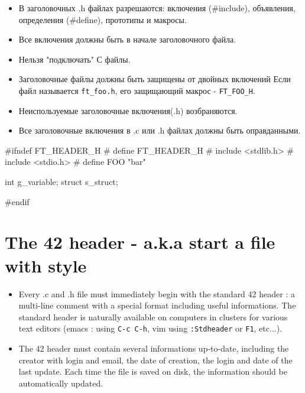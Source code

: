 \documentclass{42-ru}
\begin{document}
        \begin{itemize}

            \item В заголовочных .h файлах разрешаются: включения (#include),
                объявления, определения (#define), прототипы и макросы.

            \item Все включения должны быть в начале заголовочного файла.

            \item Нельзя "подключать" С файлы.

            \item Заголовочные файлы должны быть защищены от двойных включений
                Если файл называется \texttt{ft\_foo.h}, его защищающий макрос - \texttt{FT\_FOO\_H}.

            \item Неиспользуемые заголовочные включения(.h) возбраняются.

            \item Все заголовочные включения в .c или .h файлах должны быть оправданными.

        \end{itemize}

        \begin{42ccode}
#ifndef FT_HEADER_H
# define FT_HEADER_H
# include <stdlib.h>
# include <stdio.h>
# define FOO "bar"

int		g_variable;
struct	s_struct;

#endif
        \end{42ccode}
        \newpage



   \section{The 42 header - a.k.a start a file with style}

        \begin{itemize}

        \item Every .c and .h file must immediately begin with the standard 42 header :
          a multi-line comment with a special format including useful informations. The
          standard header is naturally available on computers in clusters for various
          text editors (emacs : using \texttt{C-c C-h}, vim using \texttt{:Stdheader} or
          \texttt{F1}, etc...).

        \item The 42 header must contain several informations up-to-date, including the
          creator with login and email, the date of creation, the login and date of the
          last update. Each time the file is saved on disk, the information should be
          automatically updated.

        \end{itemize}
        \newpage
        
\end{document}
